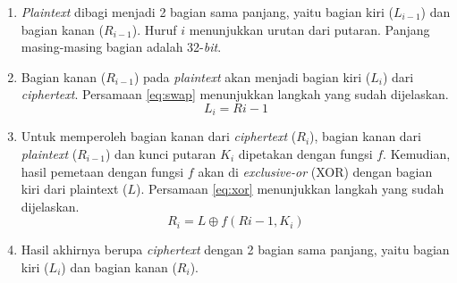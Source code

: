 \begin{enumerate}
	\item \textit{Plaintext} dibagi menjadi 2 bagian sama panjang, yaitu bagian kiri (\begin{math}L_{i-1}\end{math}) dan bagian kanan (\begin{math}R_{i-1}\end{math}). Huruf \begin{math}i\end{math} menunjukkan urutan dari putaran. Panjang masing-masing bagian adalah 32-\textit{bit}.
	\item Bagian kanan (\begin{math}R_{i-1}\end{math}) pada \textit{plaintext} akan menjadi bagian kiri (\begin{math}L_i\end{math}) dari \textit{ciphertext}. Persamaan \ref{eq:swap} menunjukkan langkah yang sudah dijelaskan.
	\begin{equation}
		L_i = R{i-1}
		\label{eq:swap}
	\end{equation}
	\item Untuk memperoleh bagian kanan dari \textit{ciphertext} (\begin{math}R_i\end{math}), bagian kanan dari \textit{plaintext} (\begin{math}R_{i-1}\end{math}) dan kunci putaran \begin{math}K_i\end{math} dipetakan dengan fungsi \begin{math}f\end{math}. Kemudian, hasil pemetaan dengan fungsi \begin{math}f\end{math} akan di \textit{exclusive-or} (XOR) dengan bagian kiri dari plaintext (\begin{math}L\end{math}). Persamaan \ref{eq:xor} menunjukkan langkah yang sudah dijelaskan.
	\begin{equation}
		R_i = L \oplus f(R{i-1}, K_i)
		\label{eq:xor}
	\end{equation}
	\item Hasil akhirnya berupa \textit{ciphertext} dengan 2 bagian sama panjang, yaitu bagian kiri (\begin{math}L_i\end{math}) dan bagian kanan (\begin{math}R_i\end{math}). 
\end{enumerate}

